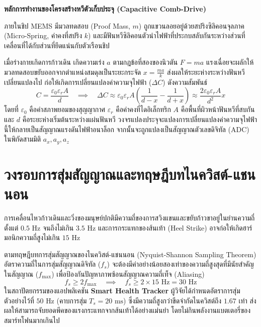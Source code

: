 \begin{theorybox}
\textbf{หลักการทำงานของโครงสร้างหวีตัวเก็บประจุ (Capacitive Comb-Drive)}

ภายในชิป MEMS มีมวลทดสอบ (Proof Mass, $m$) ถูกแขวนลอยอยู่ด้วยสปริงซิลิคอนจุลภาค (Micro-Spring, ค่าคงที่สปริง $k$) และมีฟันหวีซิลิคอนตัวนำไฟฟ้าที่ประกบสลับกันระหว่างส่วนที่เคลื่อนที่ได้กับส่วนที่ยึดแน่นกับตัวเรือนชิป

เมื่อร่างกายเกิดการก้าวเดิน เกิดความเร่ง $a$ ตามกฎข้อที่สองของนิวตัน $F = ma$ แรงเฉื่อยจะผลักให้มวลทดสอบขยับออกจากตำแหน่งสมดุลเป็นระยะกระจัด $x = \frac{ma}{k}$ ส่งผลให้ระยะห่างระหว่างฟันหวีเปลี่ยนแปลงไป ก่อให้เกิดการเปลี่ยนแปลงค่าความจุไฟฟ้า ($\Delta C$) ดังความสัมพันธ์
\begin{equation}
C = \frac{\varepsilon_0 \varepsilon_r A}{d} \quad \implies \quad \Delta C \approx \varepsilon_0 \varepsilon_r A \left( \frac{1}{d - x} - \frac{1}{d + x} \right) \approx \frac{2 \varepsilon_0 \varepsilon_r A}{d^2} x
\end{equation}
โดยที่ $\varepsilon_0$ คือค่าสภาพยอมของสุญญากาศ $\varepsilon_r$ คือค่าคงที่ไดอิเล็กทริก $A$ คือพื้นที่ผิวหน้าฟันหวีที่สบกัน และ $d$ คือระยะห่างเริ่มต้นระหว่างแผ่นฟันหวี วงจรแปลงประจุจะแปลงการเปลี่ยนแปลงค่าความจุไฟฟ้านี้ให้กลายเป็นสัญญาณแรงดันไฟฟ้าอนาล็อก จากนั้นจะถูกแปลงเป็นสัญญาณตัวเลขดิจิทัล (ADC) ในพิกัดสามมิติ $a_x, a_y, a_z$
\end{theorybox}

\section{วงรอบการสุ่มสัญญาณและทฤษฎีบทไนควิสต์-แชนนอน}
การเคลื่อนไหวก้าวเดินและวิ่งของมนุษย์ปกติมีความถี่ของการสวิงแขนและขยับก้าวขาอยู่ในย่านความถี่ตั้งแต่ $0.5\text{ Hz}$ จนถึงไม่เกิน $3.5\text{ Hz}$ และการกระแทกของส้นเท้า (Heel Strike) อาจก่อให้เกิดฮาร์มอนิกความถี่สูงไม่เกิน $15\text{ Hz}$

ตามทฤษฎีบทการสุ่มสัญญาณของไนควิสต์-แชนนอน (Nyquist-Shannon Sampling Theorem) อัตราความถี่ในการสุ่มสัญญาณดิจิทัล ($f_s$) จะต้องมีค่าอย่างน้อยสองเท่าของความถี่สูงสุดที่มีนัยสำคัญในสัญญาณ ($f_{\max}$) เพื่อป้องกันปัญหาภาพซ้อนสัญญาณความถี่เท็จ (Aliasing)
\begin{equation}
f_s \ge 2 f_{\max} \quad \implies \quad f_s \ge 2 \times 15\text{ Hz} = 30\text{ Hz}
\end{equation}
ในสถาปัตยกรรมของแอปพลิเคชัน \textbf{Smart Health Tracker} ผู้วิจัยได้กำหนดอัตราการสุ่มตัวอย่างไว้ที่ $50\text{ Hz}$ (คาบการสุ่ม $T_s = 20\text{ ms}$) ซึ่งมีความถี่สูงกว่าขีดจำกัดไนควิสต์ถึง $1.67$ เท่า ส่งผลให้สามารถจับยอดพีคของแรงกระแทกจากส้นเท้าได้อย่างแม่นยำ โดยไม่กินพลังงานแบตเตอรี่ของสมาร์ทโฟนมากเกินไป


